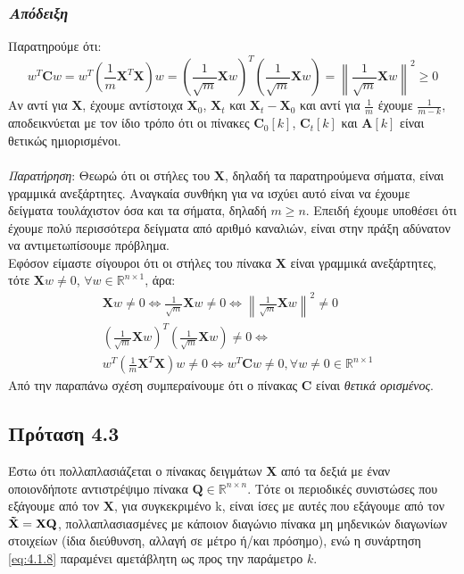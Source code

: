 \subsubsection*{\small{\textit{Απόδειξη}}}
Παρατηρούμε ότι:
$$
w^{Τ} \mathbf{C} w = w^T \left ( \frac{1}{m} \mathbf{X}^T \mathbf{X} \right ) w = \left ( \frac{1}{\sqrt{m}} \mathbf{X} w \right )^T 
\left ( \frac{1}{\sqrt{m}} \mathbf{X} w \right ) 
= \left \|  \frac{1}{\sqrt{m}} \mathbf{X} w \right \|^2 \geq 0
$$
\newpage
\noindent Αν αντί για $\mathbf{X}$, έχουμε αντίστοιχα $\mathbf{X}_0$, $\mathbf{X}_t$ και $\mathbf{X}_t - \mathbf{X}_0$ και αντί για $\frac{1}{m}$ έχουμε $\frac{1}{m-k}$, αποδεικνύεται με τον ίδιο τρόπο ότι οι πίνακες $\mathbf{C}_0[k]$, $\mathbf{C}_t[k]$ και $\mathbf{A}[k]$ είναι θετικώς ημιορισμένοι.
\\ \\
\textit{Παρατήρηση}: Θεωρώ ότι οι στήλες του $\mathbf{X}$, δηλαδή τα παρατηρούμενα σήματα, είναι γραμμικά ανεξάρτητες. Αναγκαία συνθήκη για να ισχύει αυτό είναι να έχουμε δείγματα τουλάχιστον όσα και τα σήματα, δηλαδή $m \geq n$. Επειδή έχουμε υποθέσει ότι έχουμε πολύ περισσότερα δείγματα από αριθμό καναλιών, είναι στην πράξη αδύνατον να αντιμετωπίσουμε πρόβλημα.
\\[0.5 \baselineskip]
Εφόσον είμαστε σίγουροι ότι οι στήλες του πίνακα $\mathbf{X}$ είναι γραμμικά ανεξάρτητες, τότε $\mathbf{X} w \neq 0$, $\forall w \in \mathbb{R}^{n\times 1}$, άρα:
\begin{align*}
&\mathbf{X} w \neq 0 \Leftrightarrow \frac {1}{\sqrt{m}} \mathbf{X} w \neq 0 \Leftrightarrow \left \| \frac {1}{\sqrt{m}} \mathbf{X} w \right \| ^2 \neq 0 \\
&\left ( \frac {1}{\sqrt{m}} \mathbf{X} w \right )^T \left ( \frac {1}{\sqrt{m}} \mathbf{X} w \right ) \neq 0 \Leftrightarrow \\
& w^T \left ( \frac{1}{m} \mathbf{X}^T \mathbf{X} \right ) w \neq 0
\Leftrightarrow 
w^T \mathbf{C} w \neq 0, \forall w \neq 0 \in \mathbb{R}^{n\times 1}
\end{align*}
Από την παραπάνω σχέση συμπεραίνουμε ότι ο πίνακας $\mathbf{C}$ είναι
\emph{θετικά ορισμένος}.
\subsection*{\small{Πρόταση 4.3}}
Έστω ότι πολλαπλασιάζεται ο πίνακας δειγμάτων $\mathbf{X}$ από τα δεξιά με έναν οποιονδήποτε αντιστρέψιμο πίνακα $\mathbf{Q} \in \mathbb{R}^{n\times n}$. Τότε οι περιοδικές συνιστώσες που εξάγουμε από τον $\mathbf{X}$, για συγκεκριμένο k, είναι ίσες με αυτές που εξάγουμε από τον $\mathbf{\Tilde{X}} = \mathbf{X}\mathbf{Q}$, πολλαπλασιασμένες με κάποιον διαγώνιο πίνακα μη μηδενικών διαγωνίων στοιχείων (ίδια διεύθυνση, αλλαγή σε μέτρο ή/και πρόσημο), ενώ η συνάρτηση \eqref{eq:4.1.8} παραμένει αμετάβλητη ως προς την παράμετρο $k$.
